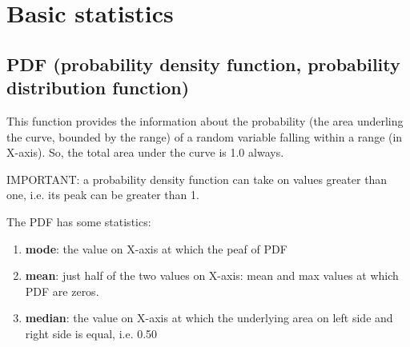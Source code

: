 
\chapter{Basic statistics}
\label{chap:basic-statistics}

\section{PDF (probability density function, probability distribution function)}
\label{sec:PDF}

This function provides the information about the probability (the area underling the curve, bounded by the range) 
of a random variable falling within a range (in X-axis).
So, the total area under the curve is 1.0 always. 

IMPORTANT: a probability density function can take on values greater than one, i.e. its peak can be greater than 1.

The PDF has some statistics:
\begin{enumerate}
  \item {\bf mode}: the value on X-axis at which the peaf of PDF
  
  \item {\bf mean}: just half of the two values on X-axis: mean and max values at which PDF are zeros.
  
  
  \item {\bf median}: the value on X-axis at which the underlying area on left side and right side is equal, i.e. 0.50
  
\end{enumerate}

